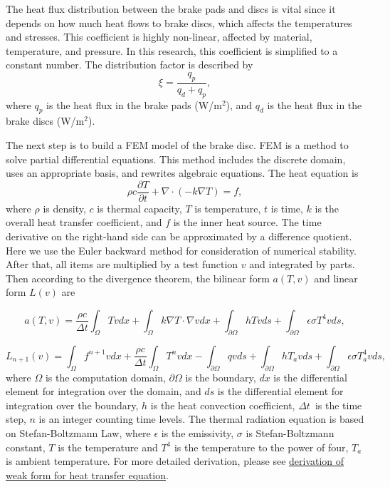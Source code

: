 The heat flux distribution between the brake pads and discs is vital since it depends on how much heat flows to brake discs, which affects the temperatures and stresses. This coefficient is highly non-linear, affected by material, temperature, and pressure. In this research, this coefficient is simplified to a constant number. The distribution factor is described by \cite{rudolf_limpert_brake_1999}
\begin{equation}
    \xi = \frac{q_p}{q_d + q_p},
\end{equation}
where \( q_p \) is the heat flux in the brake pads (W/m$^2$), and \( q_d \) is the heat flux in the brake discs (W/m$^2$). 

The next step is to build a FEM model of the brake disc. FEM is a method to solve partial differential equations. This method includes the discrete domain, uses an appropriate basis, and rewrites algebraic equations. The heat equation is 
\begin{equation}
    \rho c \frac{\partial T}{\partial t} + \nabla \cdot (- k \nabla T) = f,
    \label{heat equation}
\end{equation}
where \( \rho \) is density, \( c \) is thermal capacity, \( T \) is temperature, \( t \) is time, \( k \) is the overall heat transfer coefficient, and \( f \) is the inner heat source. The time derivative on the right-hand side can be approximated by a difference quotient. Here we use the Euler backward method for consideration of numerical stability. After that, all items are multiplied by a test function \( v \) and integrated by parts. Then according to the divergence theorem, the bilinear form \( a(T,v) \) and linear form \( L(v) \) are

\begin{equation}
    a(T,v) = \frac{\rho c}{\Delta t} \int_\Omega T v dx + \int_\Omega k \nabla T \cdot \nabla v dx + \int_{\partial \Omega} h T v ds + \int_{\partial \Omega} \epsilon \sigma T^4 v ds,
\end{equation}

\begin{equation}
    L_{n+1}(v) = \int_\Omega f^{n+1} v dx 
    + \frac{\rho c}{\Delta t} \int_\Omega  T^{n} v dx 
    -  \int_{\partial \Omega} q v ds
    +  \int_{\partial \Omega} h T_a v ds 
    + \int_{\partial \Omega} \epsilon \sigma T_a^4 v ds,
\end{equation}
where \( \Omega \) is the computation domain, \( \partial \Omega \) is the boundary, \( dx \) is the differential element for integration over the domain, and \( ds \) is the differential element for integration over the boundary, \( h \) is the heat convection coefficient,  \(\Delta t\)\ is the time step, \(n\) is an integer counting time levels. The thermal radiation equation is based on Stefan-Boltzmann Law, where \( \epsilon \) is the emissivity, \( \sigma \) is Stefan-Boltzmann constant, \(T\) is the temperature and \(T^4\) is the temperature to the power of four, \( T_a \) is ambient temperature. For more detailed derivation, please see  \href{https://github.com/Yanjun96/fenicsx/blob/main/derivation_of_heat_transfer.pdf}{derivation of weak form for heat transfer equation}.

